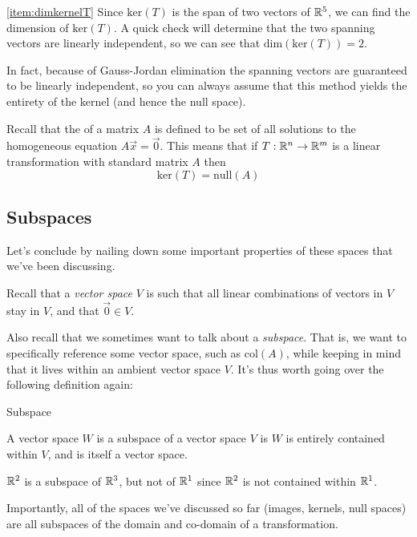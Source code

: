 \documentclass{ximera}
\begin{document}
\begin{example}
\begin{explanation}
\ref{item:dimkernelT}  Since $\mbox{ker}(T)$ is the span of two vectors of $\mathbb{R}^5$, we can find the dimension of $\mbox{ker}(T)$. A quick check will determine that the two spanning vectors are linearly independent, so we can see that $\mbox{dim}(\mbox{ker}(T))=2$.

In fact, because of Gauss-Jordan elimination the spanning vectors are guaranteed to be linearly independent, so you can always assume that this method yields the entirety of the kernel (and hence the null space).
\end{explanation}
\end{example}
 
 
Recall that the  of a matrix $A$ is defined to be set of all solutions to the homogeneous equation $A\vec{x}=\vec{0}$. This means that  if $T:\mathbb{R}^n\rightarrow \mathbb{R}^m$ is a linear transformation with standard matrix $A$ then
$$\mbox{ker}(T)=\mbox{null}(A)$$
 
\subsection*{Subspaces}

Let's conclude by nailing down some important properties of these spaces that we've been discussing. 

Recall that a \emph{vector space} $V$ is such that all linear combinations of vectors in $V$ stay in $V$, and that $\vec{0}\in V$.

Also recall that we sometimes want to talk about a \emph{subspace}. That is, we want to specifically reference some vector space, such as $\mbox{col}(A)$, while keeping in mind that it lives within an ambient vector space $V$. It's thus worth going over the following definition again:

\begin{definition}{Subspace}

  A vector space $W$ is a subspace of a vector space $V$ is $W$ is entirely contained within $V$, and is itself a vector space. 

  \begin{example}
  
    $\mathbb{R}^2$ is a subspace of $\mathbb{R}^3$, but not of $\mathbb{R}^1$ since $\mathbb{R}^2$ is not contained within $\mathbb{R}^1$. 

  \end{example}

Importantly, all of the spaces we've discussed so far (images, kernels, null spaces) are all subspaces of the domain and co-domain of a transformation. 

\end{definition}
\end{document}
